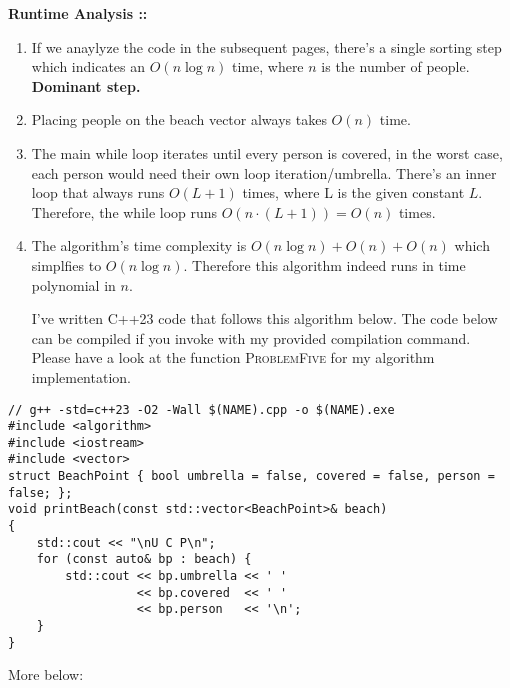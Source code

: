 \documentclass[11pt]{article}
\begin{document}
\textbf{Runtime Analysis ::}

\begin{enumerate}
\item
If we anaylyze the code in the subsequent pages, there's a single sorting step which
indicates an $O(n \log n)$ time, where $n$ is the number of people.
\textbf{Dominant step.}

\item 
Placing people on the beach vector always takes $O(n)$ time.

\item 
The main while loop iterates until every person is covered, in the worst case, each
person would need their own loop iteration/umbrella. There's an inner loop that always
runs $O(L + 1)$ times, where L is the given constant $L$. Therefore, the while loop runs
$O(n \cdot (L+1)) = O(n)$ times.

\item 
The algorithm's time complexity is $O(n\log n) + O(n) + O(n)$ which simplfies to
$O(n \log n)$. Therefore this algorithm indeed runs in time polynomial in $n$.

\vspace{5px}I've written C++23 code that follows this algorithm below. The code below
can be compiled if you invoke with my provided compilation command. Please have a look
at the function \textsc{ProblemFive} for my algorithm implementation.
\pagebreak

\end{enumerate}
\vspace{90px}

\begin{verbatim}
// g++ -std=c++23 -O2 -Wall $(NAME).cpp -o $(NAME).exe
#include <algorithm>
#include <iostream>
#include <vector>
struct BeachPoint { bool umbrella = false, covered = false, person = false; };
void printBeach(const std::vector<BeachPoint>& beach)
{
    std::cout << "\nU C P\n";
    for (const auto& bp : beach) {
        std::cout << bp.umbrella << ' '
                  << bp.covered  << ' '
                  << bp.person   << '\n';
    }
}

\end{verbatim}

More below:
\pagebreak
\end{document}
